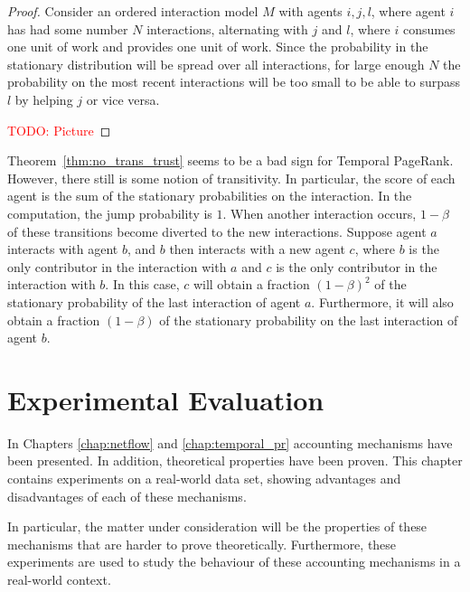 \documentclass[a4paper,11pt]{book}
\newcommand\musthave[1]{\textcolor{red}{TODO: #1}}
\theoremstyle{definition}
\begin{document}
\begin{proof}
    Consider an ordered interaction model $M$ with agents $i, j, l$, 
    where agent $i$ has had some number $N$ interactions,
    alternating with $j$ and $l$, where $i$ consumes one unit of work and provides
    one unit of work. Since the probability in the stationary distribution will
    be spread over all interactions, for large enough $N$ the probability on the most recent
    interactions will be too small to be able to surpass $l$ by helping $j$ or vice versa.

    \musthave{Picture}
\end{proof}

Theorem~\ref{thm:no_trans_trust} seems to be a bad sign for Temporal PageRank. However, 
there still is some notion of transitivity. In particular, the score of each agent
is the sum of the stationary probabilities on the interaction. In the computation, 
the jump probability is $1$. When another interaction occurs, $1-\beta$ of these
transitions become diverted to the new interactions. Suppose agent $a$ interacts
with agent $b$, and $b$ then interacts with a new agent $c$, where $b$ is the only
contributor in the interaction with $a$ and $c$ is the only contributor in
the interaction with $b$. In this case, $c$ will obtain a fraction $(1-\beta)^2$ of
the stationary probability of the last interaction of agent $a$. Furthermore, it will
also obtain a fraction $(1-\beta)$ of the stationary probability on the last interaction
of agent $b$.










\chapter{Experimental Evaluation}
\label{chap:exp}

In Chapters \ref{chap:netflow} and \ref{chap:temporal_pr} accounting mechanisms have been presented.
In addition, theoretical properties have been proven. This chapter contains experiments on a real-world
data set, showing advantages and disadvantages of each of these mechanisms.

In particular, the matter under consideration will be the properties of these mechanisms that are
harder to prove theoretically. Furthermore, these experiments are used to study the behaviour
of these accounting mechanisms in a real-world context.
\end{document}
